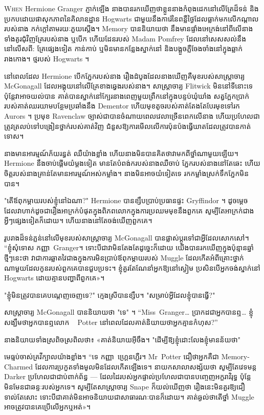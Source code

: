 
\lettrine{W}{hen} Hermione Granger ភ្ញាក់ឡើង នាងបានរកឃើញថាខ្លួននាងកំពុងដេកនៅលើគ្រែដ៏ទន់ និងប្រកបដោយផាសុកភាពនៃគិលានដ្ឋាន Hogwarts ជាមួយនឹងការ៉េនៃពន្លឺថ្ងៃដែលធ្លាក់មកលើកណ្តាលរបស់នាង កក់ក្តៅតាមរយៈភួយស្តើង។ Memory បាននិយាយថា នឹងមានផ្ទាំងអេក្រង់នៅពីលើនាង ទាំងគូរជុំវិញគ្រែរបស់នាង ឬបើក ហើយដែនរបស់ Madam Pomfrey ដែលនៅសេសសល់នឹងនៅលើសពី: គ្រែផ្សេងទៀត កាន់កាប់ ឬមិនមានកន្លែងស្នាក់នៅ និងបង្អួចភ្លឺចែងចាំងនៅក្នុងឆ្លាក់រាងកោង។ ថ្មរបស់ Hogwarts ។

នៅពេលដែល Hermione បើកភ្នែករបស់នាង រឿងដំបូងដែលនាងឃើញគឺមុខរបស់សាស្រ្តាចារ្យ McGonagall ដែលអង្គុយនៅលើគ្រែខាងឆ្វេងរបស់នាង។ សាស្រ្តាចារ្យ Flitwick មិននៅទីនោះទេ ប៉ុន្តែវាអាចយល់បាន គាត់បានស្នាក់នៅក្បែរនាងពេញមួយព្រឹកនៅក្នុងបន្ទប់ឃុំឃាំង សត្វក្អែកប្រាក់របស់គាត់ឈរយាមបន្ថែមប្រឆាំងនឹង Dementor ហើយមុខតូចរបស់គាត់តែងតែបែរមុខទៅរក Aurors ។ ប្រមុខ Ravenclaw ច្បាស់ជាបានចំណាយពេលវេលាច្រើនពេកលើនាង ហើយប្រហែលជាត្រូវត្រលប់ទៅបង្រៀនថ្នាក់របស់គាត់វិញ ជំនួសឱ្យការមើលលើការប៉ុនប៉ងធ្វើឃាតដែលត្រូវបានកាត់ទោស។

នាង​មាន​អារម្មណ៍​ភ័យ​រន្ធត់ ឈឺ​យ៉ាង​ខ្លាំង ហើយ​នាង​មិន​បាន​គិត​ថា​វា​មក​ពី​ថ្នាំ​ណា​មួយ​ឡើយ។ Hermione នឹងចាប់ផ្តើមយំម្តងទៀត មានតែបំពង់ករបស់នាងឈឺចាប់ ភ្នែករបស់នាងនៅតែឆេះ ហើយចិត្តរបស់នាងគ្រាន់តែមានអារម្មណ៍អស់កម្លាំង។ នាង​មិន​អាច​យំ​ទៀត​ទេ រក​កម្លាំង​ស្រក់​ទឹក​ភ្នែក​មិន​បាន។

"តើឪពុកម្តាយរបស់ខ្ញុំនៅឯណា?" Hermione បានខ្សឹបប្រាប់ប្រធានផ្ទះ Gryffindor ។ ដូចម្ដេចដែលវាហាក់ដូចជារឿងអាក្រក់បំផុតក្នុងពិភពលោកក្នុងការប្រឈមមុខនឹងពួកគេ សូម្បីតែអាក្រក់ជាងអ្វីៗផ្សេងទៀតក៏ដោយ។ ហើយនាងនៅតែចង់ឃើញពួកគេ។

រូបរាងដ៏ទន់ភ្លន់នៅលើមុខរបស់សាស្រ្តាចារ្យ McGonagall បានផ្លាស់ប្តូរទៅជាអ្វីដែលសោកសៅ។ “ខ្ញុំសុំទោស កញ្ញា~Granger។ ទោះបីជាវាមិនតែងតែដូច្នេះក៏ដោយ យើងបានរកឃើញក្នុងប៉ុន្មានឆ្នាំថ្មីៗនេះថា វាជាការឆ្លាតវៃជាងក្នុងការមិនប្រាប់ឪពុកម្តាយរបស់ Muggle ដែលកើតអំពីគ្រោះថ្នាក់ណាមួយដែលកូនរបស់ពួកគេបានជួបប្រទះ។ ខ្ញុំគួរតែណែនាំអ្នកឱ្យនៅស្ងៀម ប្រសិនបើអ្នកចង់ស្នាក់នៅ Hogwarts ដោយគ្មានបញ្ហាពីពួកគេ»។

"ខ្ញុំមិនត្រូវបានគេបណ្តេញចេញទេ?" ក្មេងស្រីបានខ្សឹប។ "សម្រាប់អ្វីដែលខ្ញុំបានធ្វើ?"

សាស្រ្តាចារ្យ McGonagall បាននិយាយថា "ទេ" ។ “Miss~Granger… ប្រាកដ​ជា​អ្នក​បាន​ឮ… ខ្ញុំ​សង្ឃឹម​ថា​អ្នក​បាន​ឮ​លោក ~ Potter នៅ​ពេល​ដែល​គាត់​និយាយ​ថា​អ្នក​គ្មាន​កំហុស?”

នាង​និយាយ​ទាំង​ស្រពិចស្រពិល​ថា​៖ «​គាត់​និយាយ​អ៊ីចឹង​។ "ដើម្បីឱ្យខ្ញុំដោះលែងខ្ញុំមានន័យថា"

មេធ្មប់ចាស់គ្រវីក្បាលយ៉ាងខ្លាំង។ “ទេ កញ្ញា~ហ្គ្រេនហ្គឺរ។ Mr~Potter ជឿថាអ្នកគឺជា Memory-Charmed ដែលការប្រកួតទាំងមូលមិនដែលកើតឡើងទេ។ នាយកសាលាសង្ស័យថា សូម្បីតែវេទមន្ត Darker ប្រហែលជាជាប់ពាក់ព័ន្ធ — ដែលដៃរបស់អ្នកផ្ទាល់ប្រហែលជាបានបញ្ចេញអក្ខរាវិរុទ្ធ ប៉ុន្តែមិនមែនជាឆន្ទៈរបស់អ្នកទេ។ សូម្បីតែសាស្រ្តាចារ្យ Snape ក៏យល់ឃើញថា រឿងនេះមិនគួរឱ្យជឿទាល់តែសោះ ទោះបីជាគាត់មិនអាចនិយាយជាសាធារណៈបានក៏ដោយ។ គាត់​ឆ្ងល់​ថា​តើ​ថ្នាំ Muggle អាច​ត្រូវ​បាន​គេ​ប្រើ​លើ​អ្នក​ឬ​អត់»។

